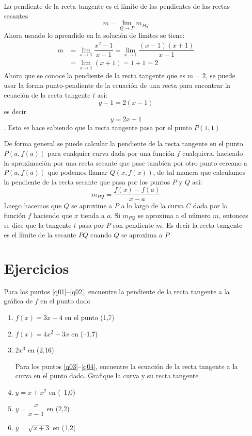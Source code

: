 \documentclass[letterpaper,twoside]{article}
\begin{document}
\begin{multicols}{2}
La pendiente de la recta tangente es el límite de las pendientes de las rectas secantes
\[m=\displaystyle{\lim_{Q\rightarrow P}m_{PQ}}\]
Ahora usando lo aprendido en la solución de límites se tiene:
\begin{align*}
m&=\displaystyle{\lim_{x\rightarrow 1}\dfrac{x^{2}-1}{x-1}=\lim_{x\rightarrow 1}\dfrac{(x-1)(x+1)}{x-1}}\\
&=\displaystyle{\lim_{x\rightarrow 1}(x+1)=1+1=2}
\end{align*}
Ahora que se conoce la pendiente de la recta tangente que es $m=2$, se puede usar la forma punto-pendiente de la ecuación de una recta para encontrar la ecuación de la recta tangente $t$ así:
\[y-1=2(x-1)\]
es decir \[y=2x-1\]. Esto se hace sabiendo que la recta tangente pasa por el punto $P(1,1)$

De forma general se puede calcular la pendiente de la recta tangente en el punto $P(a,f(a))$ para cualquier curva dada por una función $f$ cualquiera, haciendo la aproximación por una recta secante que pase también por otro punto cercano a $P(a,f(a))$ que podemos llamar $Q(x,f(x))$, de tal manera que calculamos la pendiente de la recta secante que pasa por los puntos $P$ y $Q$ así:
\[m_{PQ}=\dfrac{f(x)-f(a)}{x-a}\]
Luego hacemos que $Q$ se aproxime a $P$ a lo largo de la curva $C$ dada por la función $f$ haciendo que $x$ tienda a $a$. Si $m_{PQ}$ se aproxima a el número $m$, entonces se dice que la tangente $t$ pasa por $P$ con pendiente $m$. Es decir la recta tangente es el límite de la secante $PQ$ cuando $Q$ se aproxima a $P$
\section*{Ejercicios}
Para los puntos \ref{q01}--\ref{q02}, encuentre la pendiente de la recta tangente a la gráfica de $f$ en el punto dado
\begin{enumerate}
\item \label{q01} $f(x)=3x+4$ en el punto (1,7)
\item $f(x)=4x^{2}-3x$ en (--1,7)
\item \label{q02} $2x^{3}$ en (2,16)

Para los puntos \ref{q03}--\ref{q04}, encuentre la ecuación de la recta tangente a la curva en el punto dado. Grafique la curva y su recta tangente
\item \label{q03} $y=x+x^{2}$ en (--1,0)
\item $y=\dfrac{x}{x-1}$ en (2,2)
\item \label{q04} $y=\sqrt{x+3}$ en (1,2)


\end{enumerate}
\end{multicols}
\end{document}
